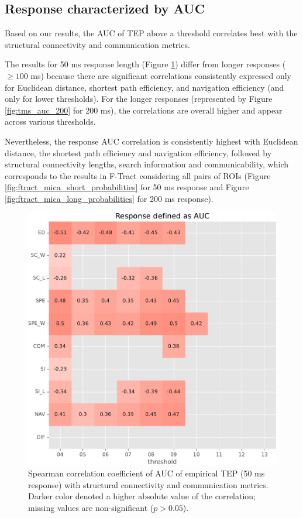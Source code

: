\subsection{Response characterized by AUC}

Based on our results, the AUC of TEP above a threshold correlates best with the structural connectivity and communication metrics.

The results for 50 ms response length (Figure \ref{fig:tms_auc_50}) differ from longer responses ($\geq100$ ms) because there are significant correlations consistently expressed only for Euclidean distance, shortest path efficiency, and navigation efficiency (and only for lower thresholds). For the longer responses (represented by Figure \ref{fig:tms_auc_200} for 200 ms), the correlations are overall higher and appear across various thresholds. 

Nevertheless, the response AUC correlation is consistently highest with Euclidean distance, the shortest path efficiency and navigation efficiency, followed by structural connectivity lengths, search information and communicability, which corresponds to the results in F-Tract considering all pairs of ROIs (Figure \ref{fig:ftract_mica_short_probabilities} for 50 ms response and Figure \ref{fig:ftract_mica_long_probabilities} for 200 ms response).

\begin{figure}
    \centering
    \includegraphics[width=\textwidth]{images/nootebook_generated/tmseeg_results/empirical/50/not_over_threshold_nan/Response defined as AUC.pdf}
    \caption[TEPs AUC (50 ms) correlation with SC and communication metrics]{Spearman correlation coefficient of AUC of empirical TEP (50 ms response) with structural connectivity and communication metrics. Darker color denoted a higher absolute value of the correlation; missing values are non-significant ($p>0.05$).}
    \label{fig:tms_auc_50}
\end{figure}


